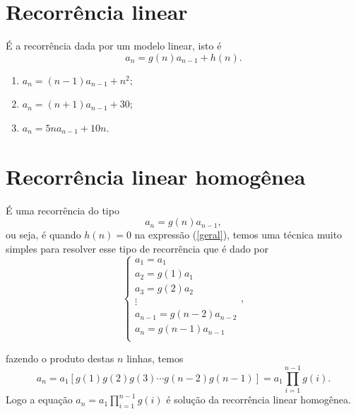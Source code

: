 	\section{Recorrência linear}
	É a recorrência dada por um modelo linear, isto é
	\begin{equation}
	\label{geral}
		a_{n} = g(n)a_{n-1} + h(n).
	\end{equation}

\begin{example} 
	\begin{enumerate}
		\item[(a)] $a_{n} = (n-1)a_{n-1} + n^2$;
		\item[(b)] $a_{n} = (n+1)a_{n-1} + 30$;
		\item[(c)] $a_{n} = 5na_{n-1} + 10n$.
	\end{enumerate}
\end{example}
	\section{Recorrência linear homogênea}
	É uma recorrência do tipo 
	\begin{equation*}
		a_{n} = g(n)a_{n-1},
	\end{equation*}
	ou seja, é quando $h(n) = 0$ na expressão (\ref{geral}), temos uma técnica muito simples para resolver esse tipo de recorrência que é dado por
	\begin{equation}
	\label{linhas}
		\begin{cases}
		a_1 = a_1\\
		a_2 = g(1)a_1\\
		a_3 = g(2)a_2\\
		\vdots\\
		a_{n-1} = g(n-2)a_{n-2}\\
		a_n = g(n-1)a_{n-1}\\
		\end{cases},
	\end{equation}
	
	\noindent fazendo o produto destas $n$ linhas, temos
	\begin{equation}
		a_{n} = a_1[g(1)g(2)g(3)\cdots g(n-2)g(n-1)] = a_1\prod_{i=1}^{n-1}g(i).
	\end{equation}
	\quad Logo a equação $\displaystyle a_{n}=a_1\prod_{i=1}^{n-1}g(i)$ é solução da recorrência linear homogênea.
	
